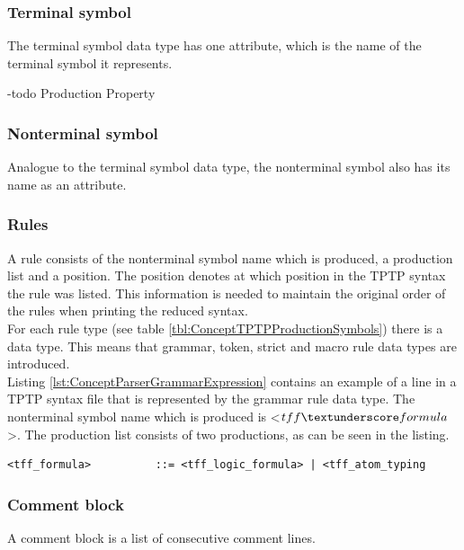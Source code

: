 
\subsubsection{Terminal symbol}
The terminal symbol data type has one attribute, which is the name of the terminal symbol it represents.

-todo Production Property

\subsubsection{Nonterminal symbol}
Analogue to the terminal symbol data type, the nonterminal symbol also has its name as an attribute.


\subsubsection{Rules}
A rule consists of the nonterminal symbol name which is produced, a production list and a position.
The position denotes at which position in the \ac{TPTP} syntax the rule was listed.
This information is needed to maintain the original order of the rules when printing the reduced syntax.\\
For each rule type (see table \ref{tbl:ConceptTPTPProductionSymbols}) there is a data type.
This means that grammar, token, strict and macro rule data types are introduced.\\
Listing \ref{lst:ConceptParserGrammarExpression} contains an example of a line in a \ac{TPTP} syntax file that is represented by the grammar rule data type.
The nonterminal symbol name which is produced is <$tff \textunderscore formula$>.  The production list consists of two productions, as can be seen in the listing.
\begin{lstlisting}[basicstyle=\scriptsize	,caption= Grammar expression,label= lst:ConceptParserGrammarExpression]
<tff_formula>          ::= <tff_logic_formula> | <tff_atom_typing
\end{lstlisting}
\subsubsection{Comment block}
A comment block is a list of consecutive comment lines.

